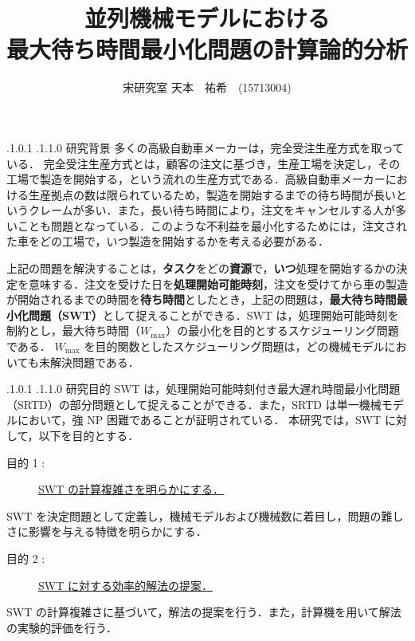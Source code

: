 \documentclass[oneside, 10pt, twocolumn]{jarticle}
\title{\bf{\rm
並列機械モデルにおける\\最大待ち時間最小化問題の計算論的分析}}
\author{宋研究室
\hspace{15pt}
天本　祐希　(15713004)}
\date{}
\makeatletter
\def\section{\@startsection {section}{1}{\z@}{-3.5ex plus -1ex minus
-.2ex}{2.3 ex plus .2ex}{\large\bf}}
\renewcommand{\section}{
\@startsection{section}{1}{\z@}
{.1\Cvs \@plus.0\Cdp \@minus.1\Cdp}%
{.1\Cvs \@plus.1\Cdp \@minus.0\Cdp}%
{\reset@font\large\bfseries}}      %
\makeatother
\begin{document}
\maketitle
\thispagestyle{empty}
\section{研究背景}
多くの高級自動車メーカーは，完全受注生産方式を取っている．
完全受注生産方式とは，顧客の注文に基づき，生産工場を決定し，その工場で製造を開始する，という流れの生産方式である．高級自動車メーカーにおける生産拠点の数は限られているため，製造を開始するまでの待ち時間が長いというクレームが多い．また，長い待ち時間により，注文をキャンセルする人が多いことも問題となっている．このような不利益を最小化するためには，注文された車をどの工場で，いつ製造を開始するかを考える必要がある．

上記の問題を解決することは，{\bf タスク}をどの{\bf 資源}で，{\bf いつ}処理を開始するかの決定を意味する．注文を受けた日を{\bf 処理開始可能時刻}，注文を受けてから車の製造が開始されるまでの時間を{\bf 待ち時間}としたとき，上記の問題は，{\bf 最大待ち時間最小化問題（SWT）}として捉えることができる．SWT は，処理開始可能時刻を制約とし，最大待ち時間（\mbox{\boldmath $W_{\max}$}）の最小化を目的とするスケジューリング問題である．
$W_{\max}$ を目的関数としたスケジューリング問題は，どの機械モデルにおいても未解決問題である．

\section{研究目的}
SWT は，処理開始可能時刻付き最大遅れ時間最小化問題（SRTD）の部分問題として捉えることができる．また，SRTD は単一機械モデルにおいて，強 NP 困難であることが証明されている\cite{SRTD}．
本研究では，SWT に対して，以下を目的とする．
\begin{description}
  \item[目的 1 :]
  \underline{SWT の計算複雑さを明らかにする．}
\end{description}
SWT を決定問題として定義し，機械モデルおよび機械数に着目し，問題の難しさに影響を与える特徴を明らかにする．

\begin{description}
  \item[目的 2 :]
  \underline{SWT に対する効率的解法の提案．}
\end{description}
SWT の計算複雑さに基づいて，解法の提案を行う．また，計算機を用いて解法の実験的評価を行う．
\end{document}
